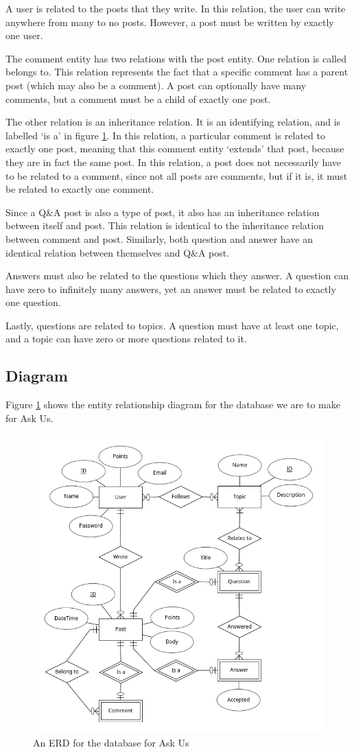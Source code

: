A user is related to the posts that they write. In this relation, the user can write anywhere from many to no posts. However, a post must be written by exactly one user.

The comment entity has two relations with the post entity. One relation is called belongs to. This relation represents the fact that a specific comment has a parent post (which may also be a comment). A post can optionally have many comments, but a comment must be a child of exactly one post.

The other relation is an inheritance relation. It is an identifying relation, and is labelled `is a' in figure \ref{erd}. In this relation, a particular comment is related to exactly one post, meaning that this comment entity `extends' that post, because they are in fact the same post. In this relation, a post does not necessarily have to be related to a comment, since not all posts are comments, but if it is, it must be related to exactly one comment.

Since a Q\&A post is also a type of post, it also has an inheritance relation between itself and post. This relation is identical to the inheritance relation between comment and post. Similarly, both question and answer have an identical relation between themselves and Q\&A post.

Answers must also be related to the questions which they answer. A question can have zero to infinitely many answers, yet an answer must be related to exactly one question.

Lastly, questions are related to topics. A question must have at least one topic, and a topic can have zero or more questions related to it.

\subsection{Diagram}

Figure \ref{erd} shows the entity relationship diagram for the database we are to make for Ask Us.

\begin{figure}[htb]
	\centering
	\includegraphics[width=\linewidth]{../../ERD/erd.png}
	\caption{An ERD for the database for Ask Us}
	\label{erd}
\end{figure}